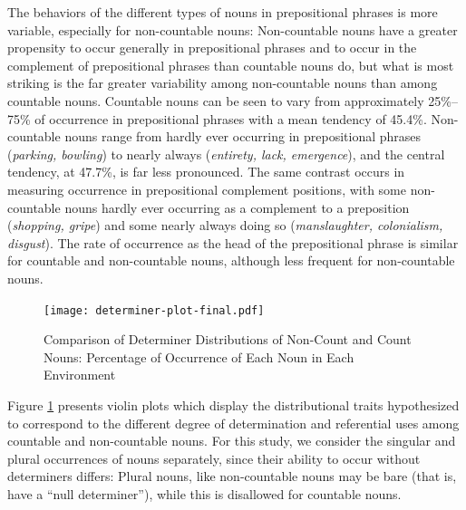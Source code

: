 \documentclass[output=paper]{langscibook}
\begin{document}
The behaviors of the different types of nouns in prepositional phrases is more variable, especially for non-countable nouns: Non-countable nouns have a greater propensity to occur generally in prepositional phrases and to occur in the complement of  prepositional phrases than countable nouns do, but what is most striking is the far greater variability among non-countable nouns than among countable nouns.  Countable nouns can be seen to vary from approximately 25\%--75\% of occurrence in prepositional phrases with a mean tendency of  45.4\%.  Non-countable nouns range from hardly ever occurring in prepositional phrases (\textit{parking, bowling}) to nearly always (\textit{entirety, lack, emergence}), and the central tendency, at 47.7\%, is far less pronounced. %
The same contrast occurs in measuring occurrence in prepositional complement positions, with some non-countable nouns  hardly ever occurring as a complement to a preposition (\textit{shopping, gripe}) and some nearly always doing so (\textit{manslaughter, colonialism, disgust}). The rate of occurrence as the head of the prepositional phrase is similar for countable and non-countable nouns, although less frequent for non-countable nouns.




\begin{figure}
    \centering
    \texttt{[image: determiner-plot-final.pdf]}
    \caption{Comparison of Determiner Distributions of Non-Count and Count Nouns: Percentage of Occurrence of Each Noun in  Each Environment}
    \label{gri-ric:fig:referentialWeight}
\end{figure}




Figure \ref{gri-ric:fig:referentialWeight} presents violin plots which display the distributional traits hypothesized to correspond to the different degree of determination and referential uses among countable and non-countable nouns. For this study,  we consider the singular and plural occurrences of nouns separately, since their ability to occur without determiners differs: Plural nouns, like non-countable nouns may be bare (that is, have a ``null determiner''), while this is disallowed for countable nouns. 
\end{document}
